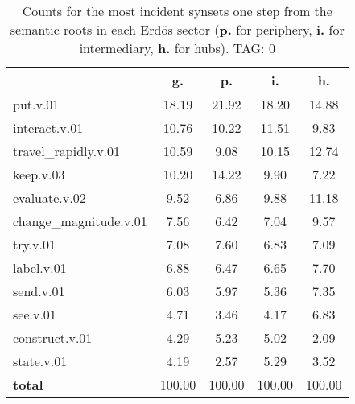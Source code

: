 \begin{table}[h!]
\begin{center}
\begin{tabular}{| l | c | c | c | c |}\hline
 & g. & p. & i. & h. \\\hline
put.v.01 & 18.19  & 21.92  & 18.20  & 14.88 \\\hline
interact.v.01 & 10.76  & 10.22  & 11.51  & 9.83 \\\hline
travel\_rapidly.v.01 & 10.59  & 9.08  & 10.15  & 12.74 \\\hline
keep.v.03 & 10.20  & 14.22  & 9.90  & 7.22 \\\hline
evaluate.v.02 & 9.52  & 6.86  & 9.88  & 11.18 \\\hline
change\_magnitude.v.01 & 7.56  & 6.42  & 7.04  & 9.57 \\\hline
try.v.01 & 7.08  & 7.60  & 6.83  & 7.09 \\\hline
label.v.01 & 6.88  & 6.47  & 6.65  & 7.70 \\\hline
send.v.01 & 6.03  & 5.97  & 5.36  & 7.35 \\\hline
see.v.01 & 4.71  & 3.46  & 4.17  & 6.83 \\\hline
construct.v.01 & 4.29  & 5.23  & 5.02  & 2.09 \\\hline
state.v.01 & 4.19  & 2.57  & 5.29  & 3.52 \\\hline
{{\bf total}} & 100.00  & 100.00  & 100.00  & 100.00 \\\hline
\end{tabular}
\caption{Counts for the most incident synsets one step from the semantic roots in each Erd\"os sector ({\bf p.} for periphery, {\bf i.} for intermediary, {\bf h.} for hubs). TAG: 0}
\end{center}
\end{table}